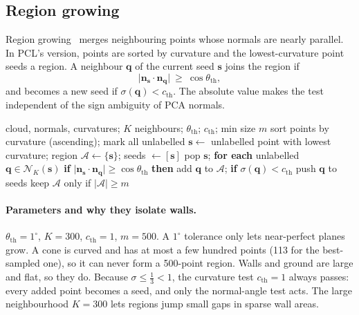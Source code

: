 \documentclass[10pt,a4paper]{scrartcl}
\newcommand{\code}[1]{\texttt{#1}}
\begin{document}
  \subsection{Region growing}

  Region growing~\citep{rabbani2006segmentation} merges neighbouring points whose
  normals are nearly parallel. In PCL's version, points are sorted by curvature and
  the lowest-curvature point seeds a region. A neighbour $\bm q$ of the current seed
  $\bm s$ joins the region if
  \begin{equation}
    \lvert\bm n_{\bm s}\cdot\bm n_{\bm q}\rvert\ \ge\ \cos\theta_{\text{th}},
  \end{equation}
  and becomes a new seed if $\sigma(\bm q)<c_{\text{th}}$. The absolute value makes
  the test independent of the sign ambiguity of PCA normals.

  \begin{algorithm}[H]
  \caption{Region growing (PCL \code{RegionGrowing}), as used to remove walls}
  \begin{algorithmic}[1]
  \Require cloud, normals, curvatures; $K$ neighbours; $\theta_{\text{th}}$; $c_{\text{th}}$; min size $m$
  \State sort points by curvature (ascending); mark all unlabelled
    \State $\bm s\gets$ unlabelled point with lowest curvature; region $\mathcal A\gets\{\bm s\}$; seeds $\gets[\bm s]$
      \State pop $\bm s$; \textbf{for each} unlabelled $\bm q\in\mathcal N_K(\bm s)$
      \State \quad \textbf{if} $\lvert\bm n_{\bm s}\cdot\bm n_{\bm q}\rvert\ge\cos\theta_{\text{th}}$ \textbf{then} add $\bm q$ to $\mathcal A$; \textbf{if} $\sigma(\bm q)<c_{\text{th}}$ push $\bm q$ to seeds
    \EndWhile
    \State keep $\mathcal A$ only if $|\mathcal A|\ge m$
  \EndWhile
  \end{algorithmic}
  \end{algorithm}

  \paragraph{Parameters and why they isolate walls.}
  $\theta_{\text{th}}=1^\circ$, $K=300$, $c_{\text{th}}=1$, $m=500$. A $1^\circ$
  tolerance only lets near-perfect planes grow. A cone is curved and has at most a
  few hundred points (113 for the best-sampled one), so it can never form a
  500-point region. Walls and ground are large and flat, so they do. Because
  $\sigma\le\tfrac13<1$, the curvature test $c_{\text{th}}=1$ always passes: every
  added point becomes a seed, and only the normal-angle test acts. The large
  neighbourhood $K=300$ lets regions jump small gaps in sparse wall
  areas.
\end{document}
